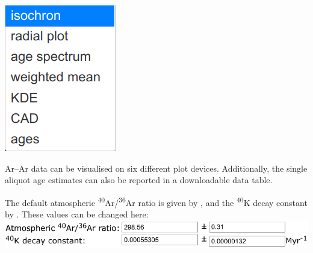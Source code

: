\begin{refsection}
\noindent\begin{minipage}[t]{.15\linewidth}
\strut\vspace*{-\baselineskip}\newline
\includegraphics[width=\linewidth]{../figures/ArArPlotdevices.png}\\
\end{minipage}
\begin{minipage}[t]{.85\textwidth}
  Ar--Ar data can be visualised on six different plot devices.
  Additionally, the single aliquot age estimates can also be reported
  in a downloadable data table.
\end{minipage}

The default atmospheric \textsuperscript{40}Ar/\textsuperscript{36}Ar
ratio is given by \citet{lee2006}, and the \textsuperscript{40}K decay
constant by \citet{renne2011}. These values can be changed here:\\

\noindent\includegraphics[width=.7\linewidth]{../figures/ArArLambda.png}


\end{refsection}
